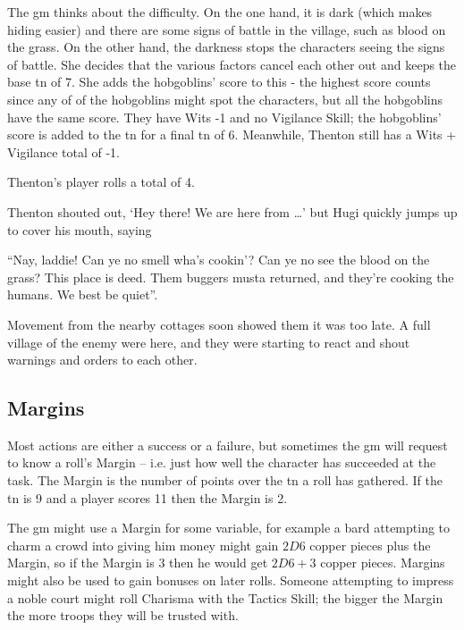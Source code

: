 \begin{multicols}{2}
{\begin{exampletext}
	The \gls{gm} thinks about the difficulty.
	On the one hand, it is dark (which makes hiding easier) and there are some signs of battle in the village, such as blood on the grass.
	On the other hand, the darkness stops the characters seeing the signs of battle.
	She decides that the various factors cancel each other out and keeps the base \gls{tn} of 7.
	She adds the hobgoblins' score to this - the highest score counts since any of of the hobgoblins might spot the characters, but all the hobgoblins have the same score.
	They have Wits -1 and no Vigilance Skill; the hobgoblins' score is added to the \gls{tn} for a final \gls{tn} of 6.
	Meanwhile, Thenton still has a Wits + Vigilance total of -1.

	Thenton's player rolls a total of 4.

	Thenton shouted out, `Hey there! We are here from \dots' but Hugi quickly jumps up to cover his mouth, saying

	``Nay, laddie! Can ye no smell wha's cookin'? Can ye no see the blood on the grass? This place is deed. Them buggers musta returned, and they're cooking the humans. We best be quiet''.

	Movement from the nearby cottages soon showed them it was too late. A full village of the enemy were here, and they were starting to react and shout warnings and orders to each other.

\end{exampletext}
}{}

\subsection{Margins}

Most actions are either a success or a failure, but sometimes the \gls{gm} will request to know a roll's Margin -- i.e. just how well the character has succeeded at the task. The Margin is the number of points over the \gls{tn} a roll has gathered. If the \gls{tn} is 9 and a player scores 11 then the Margin is 2.

The \gls{gm} might use a Margin for some variable, for example a bard attempting to charm a crowd into giving him money might gain $2D6$ copper pieces plus the Margin, so if the Margin is 3 then he would get $2D6+3$ copper pieces.
Margins might also be used to gain bonuses on later rolls.
Someone attempting to impress a noble court might roll Charisma with the Tactics Skill; the bigger the Margin the more troops they will be trusted with.


\end{multicols}
